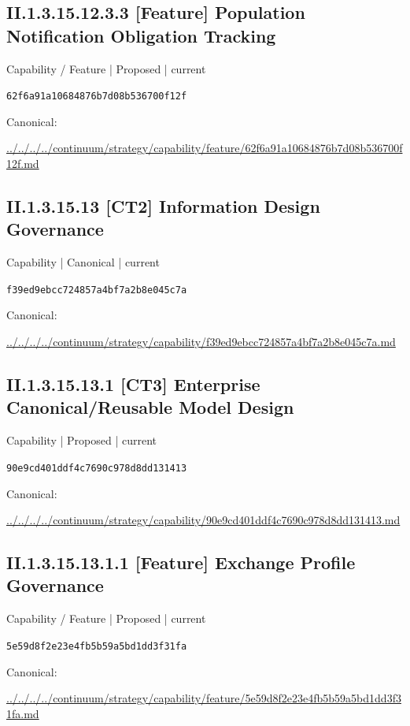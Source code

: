\documentclass[10pt,a4paper]{article}
\begin{document}
\subsection*{II.1.3.15.12.3.3 [Feature] Population Notification Obligation Tracking}
{\small Capability / Feature | Proposed | current}\par
\texttt{62f6a91a10684876b7d08b536700f12f}\par
Canonical: \par
{\footnotesize\url{../../../../continuum/strategy/capability/feature/62f6a91a10684876b7d08b536700f12f.md}}\par
\subsection*{II.1.3.15.13 [CT2] Information Design Governance}
{\small Capability | Canonical | current}\par
\texttt{f39ed9ebcc724857a4bf7a2b8e045c7a}\par
Canonical: \par
{\footnotesize\url{../../../../continuum/strategy/capability/f39ed9ebcc724857a4bf7a2b8e045c7a.md}}\par
\subsection*{II.1.3.15.13.1 [CT3] Enterprise Canonical/Reusable Model Design}
{\small Capability | Proposed | current}\par
\texttt{90e9cd401ddf4c7690c978d8dd131413}\par
Canonical: \par
{\footnotesize\url{../../../../continuum/strategy/capability/90e9cd401ddf4c7690c978d8dd131413.md}}\par
\subsection*{II.1.3.15.13.1.1 [Feature] Exchange Profile Governance}
{\small Capability / Feature | Proposed | current}\par
\texttt{5e59d8f2e23e4fb5b59a5bd1dd3f31fa}\par
Canonical: \par
{\footnotesize\url{../../../../continuum/strategy/capability/feature/5e59d8f2e23e4fb5b59a5bd1dd3f31fa.md}}\par
\end{document}
